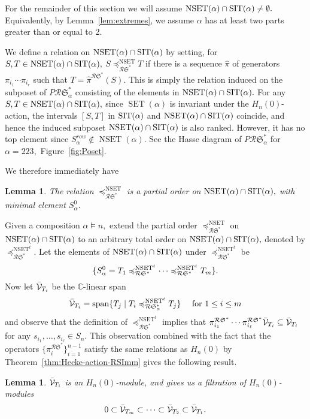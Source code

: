 \documentclass[12pt,letterpaper]{amsart}
\newtheorem{lemma}[theorem]{Lemma}
\theoremstyle{definition}
\newcommand{\poRI}{\preccurlyeq_{\mathcal{R}{\mathfrak{S}}^\ast _\alpha}}  \newcommand{\poA}{\preccurlyeq_{\mathcal{A}^\ast _\alpha}}  \newcommand{\poAbar}{\preccurlyeq_{\mathcal{\bar{A}}^\ast _\alpha} } \newcommand{\poRIcover}{\prec_{\mathcal{R}{\mathfrak{S}}^\ast _\alpha}}
\newcommand{\rdI}{\mathcal{R}\mathfrak{S}^*}
\newcommand{\SET}{\ensuremath{\operatorname{SET}}} \newcommand{\NSET}{\ensuremath{\operatorname{NSET}}}\newcommand{\SRCT}{\ensuremath{\operatorname{SRCT}}}
\newcommand{\hn}{H_n(0)}
\newcommand{\suchthat}{\;|\;}
\newcommand{\spam}{\operatorname{span}}
\begin{document}
For the remainder of this section we will assume $\NSET(\alpha)\cap\SIT(\alpha)\ne \emptyset.$  
Equivalently, by Lemma~\ref{lem:extremes}, we assume $\alpha$ has at least two parts greater  than or equal to 2. 


 We define a relation on $\NSET(\alpha)\cap\SIT(\alpha)$ by setting, for $S, T \in \NSET(\alpha)\cap\SIT(\alpha),$ $S\preccurlyeq^{\NSET}_{\rdI} T$ if there is a sequence $\hat\pi$ of generators $\pi_{i_1}\cdots \pi_{i_r}$ such that $T=\hat\pi^{\rdI}(S).$   This is simply the relation induced on the subposet   of $P\rdI_\alpha$ consisting of the elements in $\NSET(\alpha)\cap\SIT(\alpha).$  
For any $S,T\in  \NSET(\alpha)\cap\SIT(\alpha),$  since $\SET(\alpha)$ is invariant under the $\hn$-action, the intervals $[S,T]$ in $\operatorname{SIT}(\alpha)$ and $\NSET(\alpha)\cap\SIT(\alpha)$ coincide, and hence the induced subposet $\NSET(\alpha)\cap\SIT(\alpha)$ is also ranked.  However, it has no top element since $ S^{row}_\alpha\notin \NSET(\alpha).$  See the Hasse diagram of $P\rdI_\alpha$ for $\alpha=223,$  Figure~\ref{fig:Poset}.

We therefore immediately have 
\begin{lemma}\label{lem:NSET-partial-order} The relation $\preccurlyeq^{\NSET}_{\rdI}$ is a partial order on $\NSET(\alpha)\cap\SIT(\alpha),$ with minimal element $S^0_\alpha.$
\end{lemma}

Given a composition $\alpha \vDash n,$ extend the partial order $\preccurlyeq^{\NSET}_{\rdI}$ on  $\NSET(\alpha)\cap\SIT(\alpha)$ to an arbitrary total order on  $\NSET(\alpha)\cap\SIT(\alpha),$ denoted by $\preccurlyeq^{\NSET^t}_{\rdI}$. Let the elements of $\NSET(\alpha)\cap\SIT (\alpha)$ under $\preccurlyeq^{\NSET^t}_{\rdI}$ be 
$$\{S^0_\alpha=\rtau _1\preccurlyeq^{\NSET^t}_{\rdI} \cdots \preccurlyeq^{\NSET^t}_{\rdI}\rtau _m  \}.$$
 Now let $\mathcal{\bar V}_{{T}_i}$ be the $\mathbb{C}$-linear span 
 $$\mathcal{\bar V}_{\rtau_i} = \spam \{ \rtau _j \suchthat \rtau _i \poRI^{\NSET^t} \rtau _j \}\quad \text{ for } 1\leq i \leq m$$
and observe that the definition of $\preccurlyeq^{\NSET^t}_{\rdI}$ implies that $\pi^{\rdI}_{i_1}\cdots \pi^{\rdI} _{i_\ell}\mathcal{\bar V}_{\rtau_i}\subseteq \mathcal{\bar V}_{\rtau_i}$ for any $s_{i_1},\ldots, s _{i_\ell}\in S_n$. This observation combined with the fact that the operators $\{\pi^{\rdI}_i\}_{i=1}^{n-1}$ satisfy the same relations as $\hn$ by Theorem~\ref{thm:Hecke-action-RSImm} gives the following result.
\begin{lemma}\label{lem:hnquotientmodule}
$\mathcal{\bar V}_{{T}_i}$ is an $\hn$-module, and gives us a filtration of $\hn$-modules 
$$
0\subset \mathcal{\bar V}_{{T}_m} \subset \cdots \subset \mathcal{\bar V}_{{T}_{2}}\subset \mathcal{\bar V}_{{T}_1}.
$$
\end{lemma}
\end{document}
